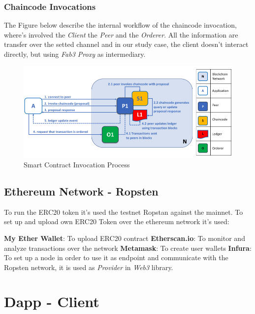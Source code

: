 {    \subsubsection{Chaincode Invocations}
    The Figure below describe the internal workflow of the chaincode invocation, where's involved the 
    \textit{Client} the \textit{Peer} and the \textit{Orderer}. All the information are transfer over the 
    setted channel and in our study case, the client doesn't interact directly, but using \textit{Fab3 Proxy}
    as intermediary.

    \begin{figure}[h!]
        \centering
        \includegraphics[totalheight=6cm]{img/sc_invokation.png}
        \caption{Smart Contract Invocation Process}
        \label{fig:sc_invokation}
    \end{figure}

\subsection{Ethereum Network - Ropsten}

To run the ERC20 token it's used the testnet Ropstan against the mainnet. 
To set up and upload own ERC20 Token over the ethereum network it's used:

\begin{outline}
    \1 \textbf{My Ether Wallet}: To upload ERC20 contract 
    \1 \textbf{Etherscan.io}: To monitor and analyze transactions over the network
    \1 \textbf{Metamask}: To create user wallets
    \1 \textbf{Infura}: To set up a node in order to use it as endpoint and communicate with the Ropsten network,
    it is used as \textit{Provider} in \textit{Web3} library.  
\end{outline}

\section{Dapp - Client}

}
